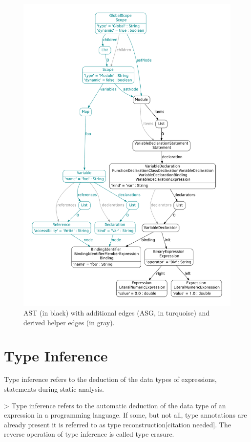 \begin{figure}[!htb]
	\centering
	\includegraphics[height=\textheight, trim=1cm 1cm 1cm 1cm,clip]{include/figures/AST-ASG}
	\caption{AST (in black) with additional edges (ASG, in turquoise) and derived helper edges (in gray).}
	\label{fig:ast-asg-example}
\end{figure}

\FloatBarrier

\section{Type Inference}

Type inference refers to the deduction of the data types of expressions, statements during static analysis.

> Type inference refers to the automatic deduction of the data type of an expression in a programming language. If some, but not all, type annotations are already present it is referred to as type reconstruction[citation needed]. The reverse operation of type inference is called type erasure.

